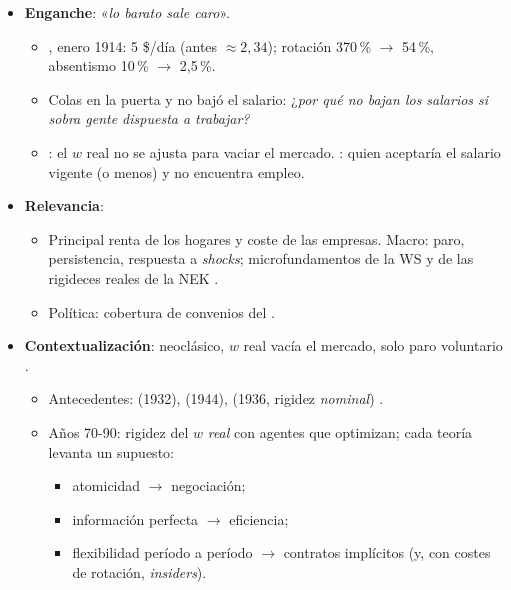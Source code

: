 \documentclass{article}
\begin{document}
\cabecerarepaso
\begin{columnas}

\begin{itemize}
\item \textbf{Enganche}: «\emph{lo barato sale caro}».
  \begin{itemize}
  \item {}, enero 1914: 5 \$/día (antes $\approx2{,}34$); rotación 370\,\% $\to$ 54\,\%, absentismo 10\,\% $\to$ 2,5\,\%.
  \item Colas en la puerta y no bajó el salario: ¿\emph{por qué no bajan los salarios si sobra gente dispuesta a trabajar?}
  \item {}: el $w$ real no se ajusta para vaciar el mercado. : quien aceptaría el salario vigente (o menos) y no encuentra empleo.
  \end{itemize}
\item \textbf{Relevancia}:
  \begin{itemize}
  \item Principal renta de los hogares y coste de las empresas. Macro: paro, persistencia, respuesta a \emph{shocks}; microfundamentos de la WS  y de las rigideces reales de la NEK .
  \item Política: cobertura de convenios del  .
  \end{itemize}
\item \textbf{Contextualización}: neoclásico, $w$ real vacía el mercado, solo paro voluntario .
  \begin{itemize}
  \item Antecedentes:  (1932),  (1944),  (1936, rigidez \emph{nominal}) .
  \item Años 70-90: rigidez del $w$ \emph{real} con agentes que optimizan; cada teoría levanta un supuesto:
    \begin{itemize}
    \item atomicidad $\to$ negociación;
    \item información perfecta $\to$ eficiencia;
    \item flexibilidad período a período $\to$ contratos implícitos (y, con costes de rotación, \emph{insiders}).
    \end{itemize}
  \end{itemize}

\end{itemize}
\end{columnas}
\end{document}
